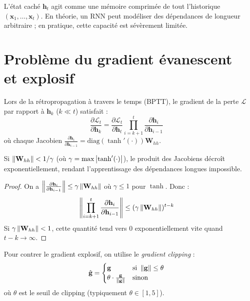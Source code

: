 \begin{remarque}
L'\'etat cach\'e $\mathbf{h}_t$ agit comme une \og m\'emoire comprim\'ee \fg
de tout l'historique $(\mathbf{x}_1, \ldots, \mathbf{x}_t)$. En th\'eorie,
un RNN peut mod\'eliser des d\'ependances de longueur arbitraire ; en pratique,
cette capacit\'e est s\'ev\`erement limit\'ee.
\end{remarque}

\section{Probl\`eme du gradient \'evanescent et explosif}
\label{sec:seq:gradient}

\begin{theoreme}
Lors de la r\'etropropagation \`a travers le temps (BPTT), le gradient de la
perte $\mathcal{L}$ par rapport \`a $\mathbf{h}_k$ ($k \ll t$) satisfait :
\[
\frac{\partial \mathcal{L}_t}{\partial \mathbf{h}_k} = \frac{\partial \mathcal{L}_t}{\partial \mathbf{h}_t} \prod_{i=k+1}^{t} \frac{\partial \mathbf{h}_i}{\partial \mathbf{h}_{i-1}}
\]
o\`u chaque Jacobien $\frac{\partial \mathbf{h}_i}{\partial \mathbf{h}_{i-1}} = \text{diag}(\tanh'(\cdot)) \mathbf{W}_{hh}$.

Si $\left\| \mathbf{W}_{hh} \right\| < 1 / \gamma$ (o\`u $\gamma = \max \left| \tanh'(\cdot) \right|$),
le produit des Jacobiens d\'ecro\^it exponentiellement, rendant l'apprentissage
des d\'ependances longues impossible.
\end{theoreme}

\begin{proof}
On a $\left\| \frac{\partial \mathbf{h}_i}{\partial \mathbf{h}_{i-1}} \right\| \leq \gamma \left\| \mathbf{W}_{hh} \right\|$
o\`u $\gamma \leq 1$ pour $\tanh$. Donc :
\[
\left\| \prod_{i=k+1}^{t} \frac{\partial \mathbf{h}_i}{\partial \mathbf{h}_{i-1}} \right\| \leq (\gamma \left\| \mathbf{W}_{hh} \right\|)^{t-k}
\]
Si $\gamma \left\| \mathbf{W}_{hh} \right\| < 1$, cette quantit\'e tend vers $0$
exponentiellement vite quand $t - k \to \infty$.
\end{proof}

\begin{formules}[title=\textbf{Gradient clipping}]
Pour contrer le gradient explosif, on utilise le \emph{gradient clipping} :
\[
\hat{\mathbf{g}} = \begin{cases}
\mathbf{g} & \text{si } \left\| \mathbf{g} \right\| \leq \theta \\
\theta \cdot \frac{\mathbf{g}}{\left\| \mathbf{g} \right\|} & \text{sinon}
\end{cases}
\]
o\`u $\theta$ est le seuil de clipping (typiquement $\theta \in [1, 5]$).
\end{formules}

